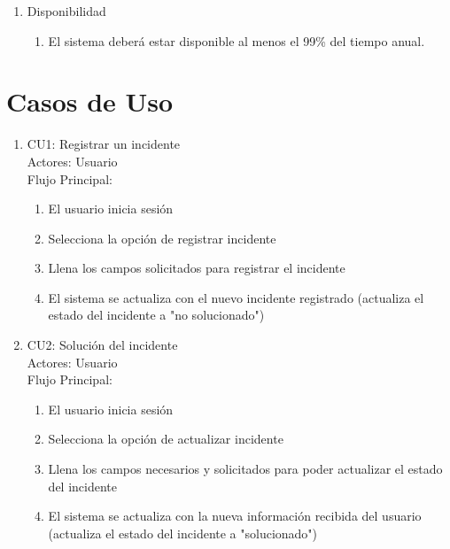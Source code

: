 \documentclass{article}
\begin{document}
\begin{enumerate}
\begin{enumerate}
\begin{enumerate}
                \end{enumerate}

            \item Disponibilidad

                \begin{enumerate}

                \item El sistema deberá estar disponible al menos el 99\% del tiempo anual.

                \end{enumerate}
            
        \end{enumerate}


\section{Casos de Uso} 
    \begin{enumerate}
        \item CU1: Registrar un incidente\\
        Actores: Usuario\\
        Flujo Principal:
            \begin{enumerate}
                \item El usuario inicia sesión
                \item Selecciona la opción de registrar incidente
                \item Llena los campos solicitados para registrar el incidente
                \item El sistema se  actualiza con el nuevo incidente registrado (actualiza el estado del incidente a "no solucionado")
            \end{enumerate}

        \item CU2: Solución del incidente\\
        Actores: Usuario\\
        Flujo Principal:
            \begin{enumerate}
                \item El usuario inicia sesión
                \item Selecciona la opción de actualizar incidente
                \item Llena los campos necesarios y solicitados para poder actualizar el estado del incidente
                \item El sistema se actualiza con la nueva información recibida del usuario (actualiza el estado del incidente a "solucionado")
            \end{enumerate}


\end{enumerate}
\end{enumerate}
\end{document}
